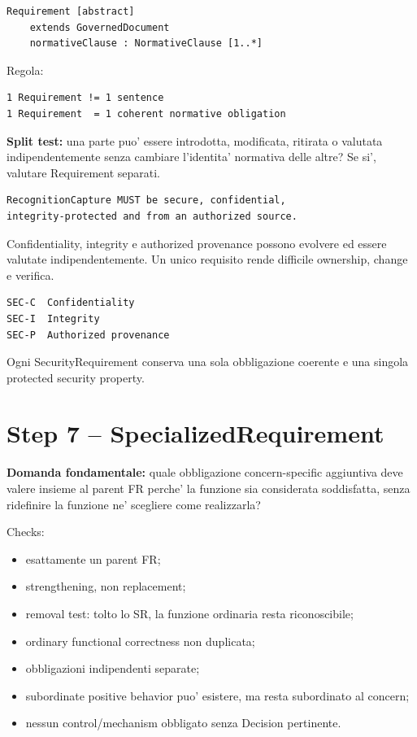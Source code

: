 \documentclass[11pt,a4paper]{article}
\begin{document}
\begin{lstlisting}
Requirement [abstract]
    extends GovernedDocument
    normativeClause : NormativeClause [1..*]
\end{lstlisting}

Regola:

\begin{lstlisting}
1 Requirement != 1 sentence
1 Requirement  = 1 coherent normative obligation
\end{lstlisting}

\textbf{Split test:} una parte puo' essere introdotta, modificata, ritirata o valutata indipendentemente senza cambiare l'identita' normativa delle altre? Se si', valutare Requirement separati.

\begin{badbox}
\begin{lstlisting}
RecognitionCapture MUST be secure, confidential,
integrity-protected and from an authorized source.
\end{lstlisting}
Confidentiality, integrity e authorized provenance possono evolvere ed essere valutate indipendentemente. Un unico requisito rende difficile ownership, change e verifica.
\end{badbox}

\begin{goodbox}
\begin{lstlisting}
SEC-C  Confidentiality
SEC-I  Integrity
SEC-P  Authorized provenance
\end{lstlisting}
Ogni SecurityRequirement conserva una sola obbligazione coerente e una singola protected security property.
\end{goodbox}

\section{Step 7 -- SpecializedRequirement}

\begin{statusclosed}
\textbf{Domanda fondamentale:} quale obbligazione concern-specific aggiuntiva deve valere insieme al parent FR perche' la funzione sia considerata soddisfatta, senza ridefinire la funzione ne' scegliere come realizzarla?
\end{statusclosed}

Checks:

\begin{itemize}
\item esattamente un parent FR;
\item strengthening, non replacement;
\item removal test: tolto lo SR, la funzione ordinaria resta riconoscibile;
\item ordinary functional correctness non duplicata;
\item obbligazioni indipendenti separate;
\item subordinate positive behavior puo' esistere, ma resta subordinato al concern;
\item nessun control/mechanism obbligato senza Decision pertinente.
\end{itemize}
\end{document}
